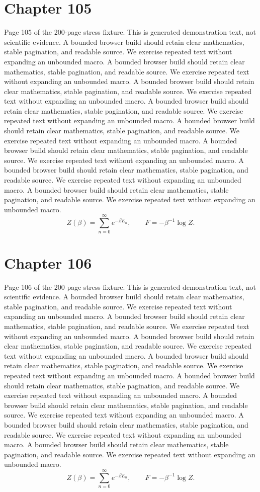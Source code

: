 \documentclass[11pt]{article}
\begin{document}
\section*{Chapter 105}
Page 105 of the 200-page stress fixture. This is generated demonstration text, not scientific evidence.
A bounded browser build should retain clear mathematics, stable pagination, and readable source. We exercise repeated text without expanding an unbounded macro.
A bounded browser build should retain clear mathematics, stable pagination, and readable source. We exercise repeated text without expanding an unbounded macro.
A bounded browser build should retain clear mathematics, stable pagination, and readable source. We exercise repeated text without expanding an unbounded macro.
A bounded browser build should retain clear mathematics, stable pagination, and readable source. We exercise repeated text without expanding an unbounded macro.
A bounded browser build should retain clear mathematics, stable pagination, and readable source. We exercise repeated text without expanding an unbounded macro.
A bounded browser build should retain clear mathematics, stable pagination, and readable source. We exercise repeated text without expanding an unbounded macro.
A bounded browser build should retain clear mathematics, stable pagination, and readable source. We exercise repeated text without expanding an unbounded macro.
A bounded browser build should retain clear mathematics, stable pagination, and readable source. We exercise repeated text without expanding an unbounded macro.
\[Z(\beta)=\sum_{n=0}^{\infty}e^{-\beta E_n},\qquad F=-\beta^{-1}\log Z.\]
\newpage
\section*{Chapter 106}
Page 106 of the 200-page stress fixture. This is generated demonstration text, not scientific evidence.
A bounded browser build should retain clear mathematics, stable pagination, and readable source. We exercise repeated text without expanding an unbounded macro.
A bounded browser build should retain clear mathematics, stable pagination, and readable source. We exercise repeated text without expanding an unbounded macro.
A bounded browser build should retain clear mathematics, stable pagination, and readable source. We exercise repeated text without expanding an unbounded macro.
A bounded browser build should retain clear mathematics, stable pagination, and readable source. We exercise repeated text without expanding an unbounded macro.
A bounded browser build should retain clear mathematics, stable pagination, and readable source. We exercise repeated text without expanding an unbounded macro.
A bounded browser build should retain clear mathematics, stable pagination, and readable source. We exercise repeated text without expanding an unbounded macro.
A bounded browser build should retain clear mathematics, stable pagination, and readable source. We exercise repeated text without expanding an unbounded macro.
A bounded browser build should retain clear mathematics, stable pagination, and readable source. We exercise repeated text without expanding an unbounded macro.
\[Z(\beta)=\sum_{n=0}^{\infty}e^{-\beta E_n},\qquad F=-\beta^{-1}\log Z.\]
\newpage
\end{document}
